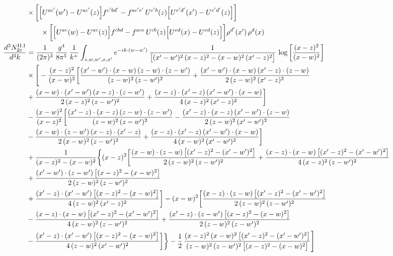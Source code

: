 \documentclass[9pt]{article}
\numberwithin{equation}{section}
\begin{document}
\begin{align}
&\times\bigg[\Big[U^{ac'}(w')-U^{ac'}(z)\Big]f^{c'bd'}-f^{ac'e'}\,U^{c'b}(z)\Big[U^{e'd'}(x')-U^{e'd'}(z)\Big]\bigg]\notag\\&\qquad\times\bigg[\Big[U^{ac}(w)-U^{ac}(z)\Big]f^{cbd}-f^{ace}\,U^{cb}(z)\Big[U^{ed}(x)-U^{ed}(z)\Big]\bigg]\rho^{d'}(x')\,\rho^{d}(x)\\
\frac{d^{3}N^{\rm II.I}_{2c}}{d^{3}k} &= \frac{1}{(2\pi)^{3}}\,\frac{g^{4}}{8\pi^{5}}\,\frac{1}{k^{+}}\int_{z,w,w^{\prime},x,x^{\prime}}e^{-ik\cdot{(w-w^{\prime})}}\,\frac{1}{\big[(x^{\prime}-w^{\prime})^{2}\,(x-z)^{2}-(x-w)^{2}\,(x^{\prime}-z)^{2}\big]}\,\log\left[\frac{(x-z)^{2}}{(x-w)^{2}}\right]\notag\\
&\times\Bigg[-\frac{(x-z)^{2}}{(x-w)^{2}}\bigg[\frac{(x^{\prime}-w^{\prime})\cdot(x-w)\,(z-w)\cdot(z-w^{\prime})}{(z-w)^{2}\,(z-w^{\prime})^{2}}+\frac{(x^{\prime}-w^{\prime})\cdot(x-w)\,(x^{\prime}-z)\cdot(z-w)}{2\,(z-w)^{2}\,(x^{\prime}-z)^{2}}\notag \\ & +\frac{(x-w)\cdot(x^{\prime}-w^{\prime})\,(x-z)\cdot(z-w^{\prime})}{2\,(x-z)^{2}\,(z-w^{\prime})^{2}}+\frac{(x-z)\cdot(x^{\prime}-z)\,(x^{\prime}-w^{\prime})\cdot(x-w)}{4\,(x-z)^{2}\,(x^{\prime}-z)^{2}}\bigg]\notag\\
&-\frac{(x-w)^{2}}{(x-z)^{2}}\bigg[\frac{(x^{\prime}-z)\cdot(x-z)\,(z-w)\cdot(z-w^{\prime})}{(z-w)^{2}\,(z-w^{\prime})^{2}}-\frac{(x^{\prime}-z)\cdot(x-z)\,(x^{\prime}-w^{\prime})\cdot(z-w)}{2\,(z-w)^{2}\,(x^{\prime}-w^{\prime})^{2}}\notag \\ & -\frac{(x-w)\cdot(z-w^{\prime})\,(x-z)\cdot(x^{\prime}-z)}{2\,(x-w)^{2}\,(z-w^{\prime})^{2}}+\frac{(x-z)\cdot(x^{\prime}-z)\,(x^{\prime}-w^{\prime})\cdot(x-w)}{4\,(x-w)^{2}\,(x^{\prime}-w^{\prime})^{2}}\bigg]\notag\\
&+\frac{1}{(x-z)^{2}-(x-w)^{2}}\bigg\{(x-z)^{2}\bigg[\frac{(x-w)\cdot(z-w)\,\big[(x^{\prime}-z)^{2}-(x^{\prime}-w^{\prime})^{2}\big]}{2\,(z-w)^{2}\,(z-w^{\prime})^{2}}+\frac{(x-z)\cdot(x-w)\,\big[(x^{\prime}-z)^{2}-(x^{\prime}-w^{\prime})^{2}\big]}{4\,(x-z)^{2}\,(z-w^{\prime})^{2}}\notag\\ &+\frac{(x^{\prime}-w^{\prime})\cdot(z-w^{\prime})\,\big[(x-z)^{2}-(x-w)^{2}\big]}{2\,(z-w)^{2}\,(z-w^{\prime})^{2}}\notag \\ & +\frac{(x^{\prime}-z)\cdot(x^{\prime}-w^{\prime})\,\big[(x-z)^{2}-(x-w)^{2}\big]}{4\,(z-w)^{2}\,(x^{\prime}-z)^{2}}\bigg]-(x-w)^{2}\bigg[\frac{(x-z)\cdot(z-w)\,\big[(x^{\prime}-z)^{2}-(x^{\prime}-w^{\prime})^{2}\big]}{2\,(z-w)^{2}\,(z-w^{\prime})^{2}}\notag \\ & -\frac{(x-z)\cdot(x-w)\,\big[(x^{\prime}-z)^{2}-(x^{\prime}-w^{\prime})^{2}\big]}{4\,(x-w)^{2}\,(z-w^{\prime})^{2}}+\frac{(x^{\prime}-z)\cdot(z-w^{\prime})\,\big[(x-z)^{2}-(x-w)^{2}\big]}{2\,(z-w)^{2}\,(z-w^{\prime})^{2}}\notag \\ & -\frac{(x^{\prime}-z)\cdot(x^{\prime}-w^{\prime})\,\big[(x-z)^{2}-(x-w)^{2}\big]}{4\,(z-w)^{2}\,(x^{\prime}-w^{\prime})^{2}}\bigg]\bigg\}-\frac{1}{2}\,\frac{(x-z)^{2}\,(x-w)^{2}\,\big[(x^{\prime}-z)^{2}-(x^{\prime}-w^{\prime})^{2}\big]}{(z-w)^{2}\,(z-w^{\prime})^{2}\,\big[(x-z)^{2}-(x-w)^{2}\big]}\Bigg]\notag\\

\end{align}
\end{document}
